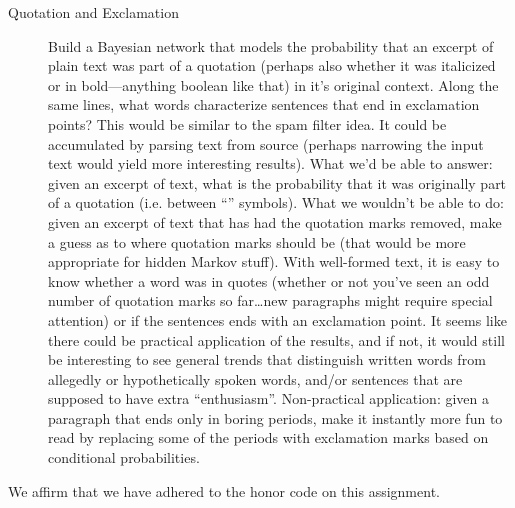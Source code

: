 \documentclass[11pt]{amsart}
\newcommand{\honor}{We affirm that we have adhered to the honor code on this assignment.}
\begin{document}
\begin{description}
\item[Quotation and Exclamation]
Build a Bayesian network that models the probability that an excerpt of plain
text was part of a quotation (perhaps also whether it was italicized or in
bold\----anything boolean like that) in it's original context.  Along the same
lines, what words characterize sentences that end in exclamation points?  This
would be similar to the spam filter idea.  It could be accumulated by parsing
text from source (perhaps narrowing the input text would yield more interesting
results).  What we'd be able to answer: given an excerpt of text, what is the
probability that it was originally part of a quotation (i.e. between ``''
symbols).  What we wouldn't be able to do: given an excerpt of text that has
had the quotation marks removed, make a guess as to where quotation marks
should be (that would be more appropriate for hidden Markov stuff).  With
well-formed text, it is easy to know whether a word was in quotes (whether or
not you've seen an odd number of quotation marks so far\dots new paragraphs might
require special attention) or if the sentences ends with an exclamation point.
It seems like there could be practical application of the results, and if not,
it would still be interesting to see general trends that distinguish written
words from allegedly or hypothetically spoken words, and/or sentences that are
supposed to have extra ``enthusiasm''.  Non-practical application: given a
paragraph that ends only in boring periods, make it instantly more fun to read
by replacing some of the periods with exclamation marks based on conditional
probabilities.

\end{description}

\honor
\end{document}
